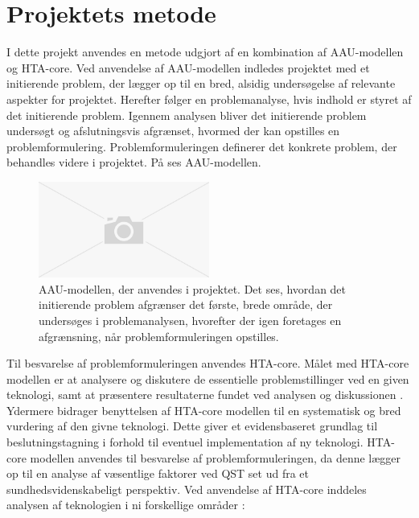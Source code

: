\section{Projektets metode}
I dette projekt anvendes en metode udgjort af en kombination af AAU-modellen og HTA-core. 
Ved anvendelse af AAU-modellen indledes projektet med et initierende problem, der lægger op til en bred, alsidig undersøgelse af relevante aspekter for projektet. Herefter følger en problemanalyse, hvis indhold er styret af det initierende problem. Igennem analysen bliver det initierende problem undersøgt og afslutningsvis afgrænset, hvormed der kan opstilles en problemformulering. Problemformuleringen definerer det konkrete problem, der behandles videre i projektet. På  ses AAU-modellen. 

\begin{figure}[H] 
\begin{center}
\includegraphics[width=0.5\textwidth]{figures/cMetode/AAUmodel}
\end{center}
\caption{AAU-modellen, der anvendes i projektet. Det ses, hvordan det initierende problem afgrænser det første, brede område, der undersøges i problemanalysen, hvorefter der igen foretages en afgrænsning, når problemformuleringen opstilles.} 
\label{fig:AAUmodel} 
\end{figure}

Til besvarelse af problemformuleringen anvendes HTA-core. Målet med HTA-core modellen er at analysere og diskutere de essentielle problemstillinger ved en given teknologi, samt at præsentere resultaterne fundet ved analysen og diskussionen \citep{HTAcore}. Ydermere bidrager benyttelsen af HTA-core modellen til en systematisk og bred vurdering af den givne teknologi. Dette giver et evidensbaseret grundlag til beslutningstagning i forhold til eventuel implementation af ny teknologi. \citep{mtvhaandbog2007} \citep{HTAcore}  HTA-core modellen anvendes til besvarelse af problemformuleringen, da denne lægger op til en analyse af væsentlige faktorer ved QST set ud fra et sundhedsvidenskabeligt perspektiv. Ved anvendelse af HTA-core inddeles analysen af teknologien i ni forskellige områder \citep{HTAcore}:

